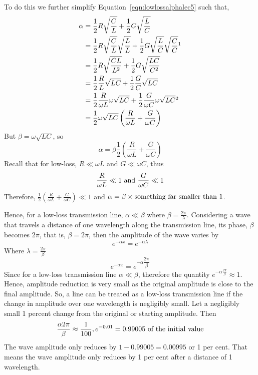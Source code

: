 To do this we further simplify Equation~\eqref{eqn:lowlossalphalec5} such that,
\begin{align*}
\alpha &=\frac{1}{2}R\sqrt{\frac{C}{L}} + \frac{1}{2}G\sqrt{\frac{L}{C}}\\	
&= \frac{1}{2} R \sqrt{\frac{C}{L}} \sqrt{\frac{L}{L}} + \frac{1}{2} G \sqrt{\frac{L}{C}} \sqrt{\frac{C}{C}}\footnotemark\\
&= \frac{1}{2} R \sqrt{\frac{CL}{L^2}} + \frac{1}{2} G \sqrt{\frac{LC}{C^2}}\\
&= \frac{1}{2} \frac{R}{L} \sqrt{LC} + \frac{1}{2} \frac{G}{C} \sqrt{LC}\\
&= \frac{1}{2} \frac{R}{\omega L} \omega \sqrt{LC} + \frac{1}{2} \frac{G}{\omega C} \omega \sqrt{LC}\footnotemark\\
&= \frac{1}{2} \omega\sqrt{LC}\left(\frac{R}{\omega L} + \frac{G}{\omega C}\right)
\end{align*}
But $\beta = \omega \sqrt{LC}$, so
\begin{equation}
\alpha = \beta\frac{1}{2} \left(\frac{R}{\omega L} + \frac{G}{\omega C}\right)
\end{equation}
Recall that for low-loss, $R\ll\omega L$ and $G\ll\omega C$, thus
\[\frac{R}{\omega L} \ll 1\textnormal{ and }\frac{G}{\omega C} \ll 1\]
Therefore, $\frac{1}{2} \left(\frac{R}{\omega L} + \frac{G}{\omega C}\right) \ll 1$ and $\alpha = \beta \times \textnormal{something far smaller than 1}$.

Hence, for a low-loss transmission line, $\alpha \ll \beta$ where $\beta = \frac{2 \pi}{\lambda}$.
Considering a wave that travels a distance of one wavelength along the transmission line, its phase, $\beta$ becomes $2\pi$, that is, $\beta = 2 \pi$, then the amplitude of the wave varies by
\begin{equation*}
e^{-\alpha x} = e^{-\alpha\lambda}	
\end{equation*}
Where $\lambda = \frac{2\pi}{\beta}$
\begin{equation*}
e^{-\alpha x} = e^{-\alpha \dfrac{2 \pi}{\beta}}
\end{equation*}
Since for a low-loss transmission line $\alpha\ll\beta$, therefore the quantity $e^{-\alpha \frac{2 \pi}{\beta}} \approx 1$. Hence, amplitude reduction is very small as the original amplitude is close to the final amplitude. So, a line can be treated as a low-loss transmission line if the change in amplitude over one wavelength is negligibly small. Let a negligibly small 1 percent change from the original or starting amplitude. Then
\[\frac{\alpha 2 \pi}{\beta} \approx \frac{1}{100}, e^{-0.01} = 0.99005\textnormal{ of the initial value}\]
The wave amplitude only reduces by $1-0.99005=0.00995$ or 1 per cent. That means the wave amplitude only reduces by 1 per cent after a distance of 1 wavelength.

